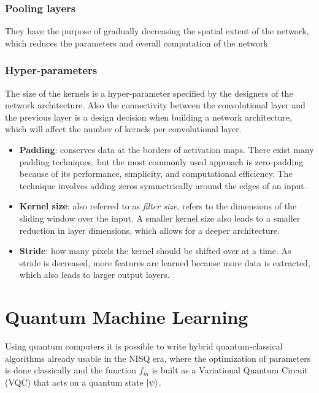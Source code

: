 \documentclass[
  13pt,
  a4paper,
  DIV=11,
  numbers=noendperiod]{scrreprt}
\begin{document}
\subsubsection{Pooling layers}\label{pooling-layers}

They have the purpose of gradually decreasing the spatial extent of the
network, which reduces the parameters and overall computation of the
network

\subsubsection{Hyper-parameters}\label{hyper-parameters}

The size of the kernels is a hyper-parameter specified by the designers
of the network architecture. Also the connectivity between the
convolutional layer and the previous layer is a design decision when
building a network architecture, which will affect the number of kernels
per convolutional layer.

\begin{itemize}
\item
  \textbf{Padding}: conserves data at the borders of activation maps.
  There exist many padding techniques, but the most commonly used
  approach is zero-padding because of its performance, simplicity, and
  computational efficiency. The technique involves adding zeros
  symmetrically around the edges of an input.
\item
  \textbf{Kernel size}: also referred to as \emph{filter size}, refers
  to the dimensions of the sliding window over the input. A smaller
  kernel size also leads to a smaller reduction in layer dimensions,
  which allows for a deeper architecture.
\item
  \textbf{Stride}: how many pixels the kernel should be shifted over at
  a time. As stride is decreased, more features are learned because more
  data is extracted, which also leads to larger output layers.
\end{itemize}

\section{Quantum Machine Learning}\label{quantum-machine-learning}

Using quantum computers it is possible to write hybrid quantum-classical
algorithms already usable in the NISQ era, where the optimization of
parameters is done classically and the function \(f_m\) is built as a
Variational Quantum Circuit (VQC) that acts on a quantum state
\(\ket{\psi}\).
\end{document}
